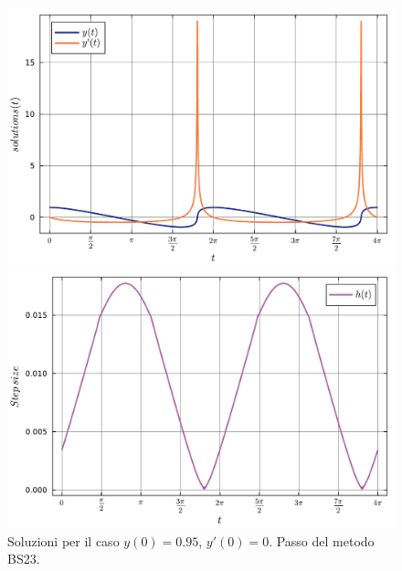 \documentclass[letterpaper, 12pt]{article}
\numberwithin{equation}{section}    %
\begin{document}
\begin{figure}[!ht]
    \centering
    \begin{minipage}[b]{0.40\textwidth}
        \includegraphics[width=\textwidth]{6367.pdf}
    \end{minipage}
    \hspace{0.5cm}
    \begin{minipage}[b]{0.40\textwidth}
        \includegraphics[width=\textwidth]{6368.pdf}
    \end{minipage}
    \caption{Soluzioni per il caso $y(0) = 0.95$, $y'(0) = 0$. Passo del metodo BS23.}
    \label{fig:es6_3_6_4}
\end{figure}
\end{document}
